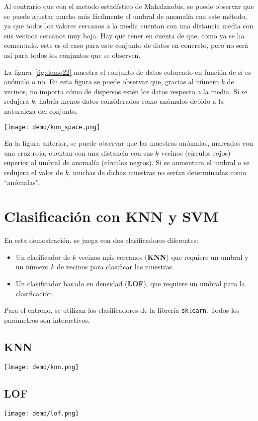 Al contrario que con el metodo estadístico de Mahalanobis, se puede observar que se puede ajustar mucho más
fácilmente el umbral de anomalía con este método, ya que todos los valores cercanos a la media cuentan con una
distancia media con sus vecinos cercanos muy baja. Hay que tener en cuenta de que, como ya se ha comentado,
este es el caso para este conjunto de datos en concreto, pero no será así para todos los conjuntos que se observen.

La figura~\ref{fig:demo22} muestra el conjunto de datos coloreado en función de si es anómalo o no. En esta figura
se puede observar que, gracias al número $k$ de vecinos, no importa cómo de dispersos estén los datos respecto a
la media. Si se redujera $k$, habría menos datos considerados como anómalos debido a la naturaleza del conjunto.

\noindent
\begin{minipage}{\linewidth}
	\centering
	\texttt{[image: demo/knn\_space.png]}
	\label{fig:demo22}
\end{minipage}

En la figura anterior, se puede observar que las muestras anómalas, marcadas con una cruz roja, cuentan con una
distancia con sus $k$ vecinos (círculos rojos) superior al umbral de anomalía (círculos negros). Si se aumentara
el umbral o se redujera el valor de $k$, muchas de dichas muestras no serían determinadas como ``anómalas''.
\newpage{}
\section{Clasificación con KNN y SVM}
En esta demostración, se juega con dos clasificadores diferentes:
\begin{itemize}
	\item Un clasificador de $k$ vecinos más cercanos (\textbf{KNN}) que requiere un umbral y un
		número $k$ de vecinos para clasificar las muestras.
	\item Un clasificador basado en densidad (\textbf{LOF}), que requiere un umbral para la
	clasificación.
\end{itemize}

Para el entreno, se utilizan los clasificadores de la librería \Verb#sklearn#. Todos los parámetros son interactivos.

\subsection{KNN}
\noindent
\begin{minipage}{\linewidth}
	\centering
	\texttt{[image: demo/knn.png]}
	\label{fig:demo31}
\end{minipage}

\subsection{LOF}
\noindent
\begin{minipage}{\linewidth}
	\centering
	\texttt{[image: demo/lof.png]}
	\label{fig:demo32}
\end{minipage}
